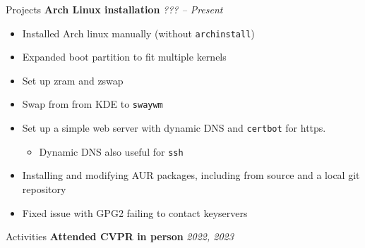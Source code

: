\begin{rSection}{Projects}
		{\bf Arch Linux installation}{} \hfill {\em ??? -- Present}
			\begin{itemize}
				\item Installed Arch linux manually (without \verb|archinstall|)
				\item Expanded boot partition to fit multiple kernels
				\item Set up zram and zswap
				\item Swap from from KDE to \verb`swaywm`
				\item Set up a simple web server with dynamic DNS and \verb`certbot` for https.
				\begin{itemize}
					\item Dynamic DNS also useful for \verb|ssh|
				\end{itemize}
				\item Installing and modifying AUR packages, including from source and a local git repository
				\item Fixed issue with GPG2 failing to contact keyservers
			\end{itemize}
		
	\end{rSection}
	
	\begin{rSection}{Activities}
		{\bf Attended CVPR in person} \hfill {\em 2022, 2023}
	\end{rSection}
	
